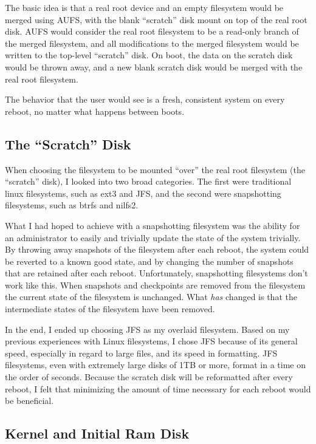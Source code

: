 \documentclass[12pt]{article}
\begin{document}
The basic idea is that a real root device and an empty filesystem would be
merged using AUFS, with the blank ``scratch'' disk mount on top of the real
root disk.  AUFS would consider the real root filesystem to be a read-only
branch of the merged filesystem, and all modifications to the merged filesystem
would be written to the top-level ``scratch'' disk. On boot, the data on the
scratch disk would be thrown away, and a new blank scratch disk would be merged
with the real root filesystem.

The behavior that the user would see is a fresh, consistent system on every
reboot, no matter what happens between boots.

\subsection{The ``Scratch'' Disk}

When choosing the filesystem to be mounted ``over'' the real root filesystem
(the ``scratch'' disk), I looked into two broad categories.  The first were
traditional linux filesystems, such as ext3 and JFS, and the second were
snapshotting filesystems, such as btrfs and nilfs2.  

What I had hoped to achieve with a snapshotting filesystem was the ability for
an administrator to easily and trivially update the state of the system
trivially.  By throwing away snapshots of the filesystem after each reboot, the
system could be reverted to a known good state, and by changing the number of
snapshots that are retained after each reboot.  Unfortunately, snapshotting
filesystems don't work like this.  When snapshots and checkpoints are removed
from the filesystem the current state of the filesystem is unchanged.  What
\emph{has} changed is that the intermediate states of the filesystem have been
removed.  

In the end, I ended up choosing JFS as my overlaid filesystem.  Based on my
previous experiences with Linux filesystems, I chose JFS because of its general
speed, especially in regard to large files, and its speed in formatting.  JFS
filesystems, even with extremely large disks of 1TB or more, format in a time
on the order of seconds.  Because the scratch disk will be reformatted after
every reboot, I felt that minimizing the amount of time necessary for each
reboot would be beneficial.

\subsection{Kernel and Initial Ram Disk}
\end{document}
